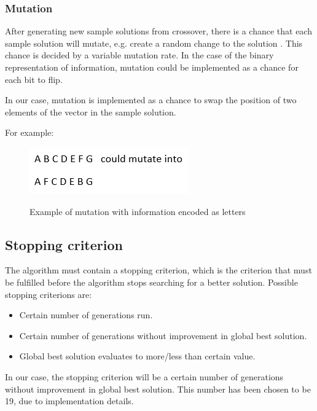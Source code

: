 \FloatBarrier

\subsubsection{Mutation}
After generating new sample solutions from crossover, there is a chance that each sample solution will mutate, e.g. create a random change to the solution . This chance is decided by a variable mutation rate. In the case of the binary representation of information, mutation could be implemented as a chance for each bit to flip.

In our case, mutation is implemented as a chance to swap the position of two elements of the vector in the sample solution. 

For example:
\begin{figure}[h]
	\centering
	{\includegraphics[scale=0.5]{Images/mutation_letters.PNG}}\\[0.5cm]
	\caption{Example of mutation with information encoded as letters}
	\label{fig:mutation_letters}
\end{figure}

\subsection{Stopping criterion}
The algorithm must contain a stopping criterion, which is the criterion that must be fulfilled before the algorithm stops searching for a better solution. Possible stopping criterions are:

\begin{itemize}
	\item Certain number of generations run.
	\item Certain number of generations without improvement in global best solution.
	\item Global best solution evaluates to more/less than certain value.
\end{itemize}

In our case, the stopping criterion will be a certain number of generations without improvement in global best solution. This number has been chosen to be 19, due to implementation details.